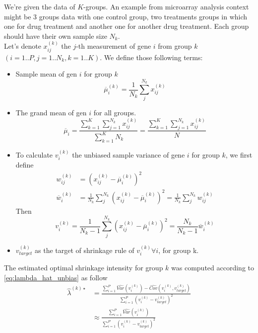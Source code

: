 We're given the data of $K$-groups. An example from microarray analysis context might be 3 groups data with one control group, two treatments groups in which one for drug treatment and another one for another drug treatment. Each group should have their own sample size $N_k$.\\
Let's denote $x^{(k)}_{ij}$ the $j$-th measurement of gene $i$ from group $k$ $(i = 1..P, j = 1..N_k, k = 1..K)$. We define those following terms:
\begin{itemize}
	\item Sample mean of gen $i$ for group $k$
	\begin{equation*}
		\overline \mu_i^{(k)} = \frac{1}{N_k}\sum^{N_k}_j{x^{(k)}_{ij}}
	\end{equation*}
	\item The grand mean of gen $i$ for all groups.
	\begin{equation*}
		\overline \mu_i = \frac	{\sum^K_{k=1}\sum^{N_k}_{j=1}x^{(k)}_{ij}}
								{\sum^K_{k=1}N_k}
						= \frac	{\sum^K_{k=1}\sum^{N_k}_{j=1}x^{(k)}_{ij}}
								{N}
	\end{equation*}
	\item To calculate $v^{(k)}_i$ the unbiased sample variance of gene $i$ for group $k$, we first define
	\begin{align*}
		w^{(k)}_{ij} 			&= (x^{(k)}_{ij} - \overline \mu_i^{(k)})^2 \\
		\overline{w}^{(k)}_i 	&= \frac{1}{N_k}\sum^{N_k}_j{(x^{(k)}_{ij} - \overline \mu_i^{(k)})^2} 
								= \frac{1}{N_k}\sum^{N_k}_j{w^{(k)}_{ij}}
	\end{align*}	
	Then
	\begin{equation*}
		v^{(k)}_i = \frac{1}{N_k-1}\sum^{N_k}_j{(x^{(k)}_{ij} - \overline \mu_i^{(k)})^2} 
					= \frac{N_k}{N_k-1}\overline{w}^{(k)}_i
	\end{equation*}		
	\item $v^{(k)}_{target}$ as the target of shrinkage rule of $v^{(k)}_i \forall i$, for group k.
\end{itemize}
The estimated optimal shrinkage intensity for group $k$ was computed according to \autoref{eq:lambda_hat_unbias} as follow
\begin{align}
	\hat \lambda^{(k)\star} &= \frac{\sum^P_{i=1}\widehat{Var}(v^{(k)}_i) - \widehat{Cov}(v^{(k)}_i, v^{(k)}_{target})}
									{\sum^P_{i=1}(v^{(k)}_i - v^{(k)}_{target})^2} \nonumber \\
							&\approx \frac	{ \sum^P_{i=1}\widehat{Var}(v^{(k)}_i) }
											{ \sum^P_{i=1}(v^{(k)}_i - v^{(k)}_{target})^2 }
\end{align}
